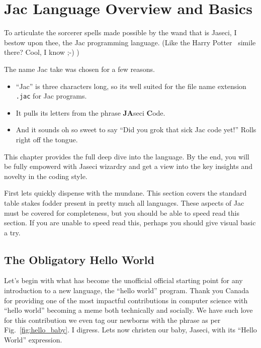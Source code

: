 \chapter{Jac Language Overview and Basics}

To articulate the sorcerer spells made possible by the wand that is Jaseci, I bestow upon thee, the Jac programming language. (Like the Harry Potter~\cite{harrypotter} simile there? Cool, I know ;-) )
\par
The name Jac take was chosen for a few reasons.
\begin{itemize}
    \item ``Jac'' is three characters long, so its well suited for the file name extension \texttt{.jac} for Jac programs.
    \item It pulls its letters from the phrase \textbf{JA}seci \textbf{C}ode.
    \item And it sounds oh so sweet to say ``Did you \gls{grok} that \gls{sick} Jac code yet!'' Rolls right off the tongue.
\end{itemize}
\par
This chapter provides the full deep dive into the language. By the end, you will be fully empowerd with Jaseci wizardry and get a view into the key insights and novelty in the coding style.

First lets quickly dispense with the mundane. This section covers the standard table stakes fodder present in pretty much all languages. These aspects of Jac must be covered for completeness, but you should be able to speed read this section. If you are unable to speed read this, perhaps you should give visual basic a try.

\section{The Obligatory Hello World}
\printfigHelloWorldBaby
Let's begin with what has become the unofficial official starting point for any introduction to a new language, the ``hello world'' program. Thank you Canada for providing one of the most impactful contributions in computer science with ``hello world'' becoming a meme both technically and socially. We have such love for this contribution we even tag our newborns with the phrase as per Fig.~\ref{fig:hello_baby}. I digress. Lets now \gls{christen} our baby, Jaseci, with its ``Hello World'' expression.

